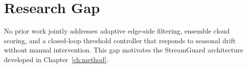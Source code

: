 \section{Research Gap}
No prior work jointly addresses adaptive edge-side filtering, ensemble cloud scoring, and a
closed-loop threshold controller that responds to seasonal drift without manual
intervention. This gap motivates the StreamGuard architecture developed in
Chapter~\ref{ch:method}.

